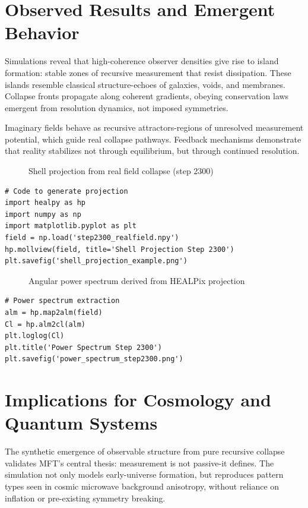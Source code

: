 \section{Observed Results and Emergent Behavior}
Simulations reveal that high-coherence observer densities give rise to island formation: stable zones of recursive measurement that resist dissipation. These islands resemble classical structure-echoes of galaxies, voids, and membranes. Collapse fronts propagate along coherent gradients, obeying conservation laws emergent from resolution dynamics, not imposed symmetries.

Imaginary fields behave as recursive attractors-regions of unresolved measurement potential, which guide real collapse pathways. Feedback mechanisms demonstrate that reality stabilizes not through equilibrium, but through continued resolution.

\begin{figure}[h]
\centering

\caption{Shell projection from real field collapse (step 2300)}
\end{figure}
\begin{verbatim}
# Code to generate projection
import healpy as hp
import numpy as np
import matplotlib.pyplot as plt
field = np.load('step2300_realfield.npy')
hp.mollview(field, title='Shell Projection Step 2300')
plt.savefig('shell_projection_example.png')
\end{verbatim}

\begin{figure}[h]
\centering

\caption{Angular power spectrum derived from HEALPix projection}
\end{figure}
\begin{verbatim}
# Power spectrum extraction
alm = hp.map2alm(field)
Cl = hp.alm2cl(alm)
plt.loglog(Cl)
plt.title('Power Spectrum Step 2300')
plt.savefig('power_spectrum_step2300.png')
\end{verbatim}

\section{Implications for Cosmology and Quantum Systems}
The synthetic emergence of observable structure from pure recursive collapse validates MFT's central thesis: measurement is not passive-it defines. The simulation not only models early-universe formation, but reproduces pattern types seen in cosmic microwave background anisotropy, without reliance on inflation or pre-existing symmetry breaking.

